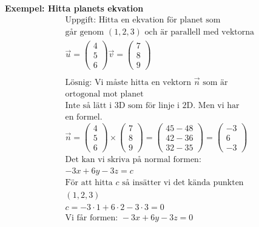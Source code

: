 \begin{multicols}{2}
\textbf{Exempel: Hitta planets ekvation}
\begin{align*}
  &\text{Uppgift: Hitta en ekvation för planet som } \\
  &\text{går genom $(1, 2, 3)$ och är parallell med vektorna } \\
  &\vec{u} = \begin{pmatrix} 4 \\ 5 \\ 6 \end{pmatrix}
  \vec{v} = \begin{pmatrix} 7 \\ 8 \\ 9 \end{pmatrix} \\
  &\\
  &\text{Lösnig: Vi måste hitta en vektorn $\vec{n}$ som är} \\
  &\text{ortogonal mot planet}  \\
  &\text{Inte så lätt i 3D som för linje i 2D. Men vi har} \\
  &\text{en formel.} \\
  &\vec{n} = \begin{pmatrix} 4 \\ 5 \\ 6 \end{pmatrix} \times
  \begin{pmatrix} 7 \\ 8 \\ 9 \end{pmatrix} =
  \begin{pmatrix} 45-48 \\ 42-36 \\ 32-35 \end{pmatrix} =
  \begin{pmatrix} -3 \\ 6 \\ -3 \end{pmatrix} \\
  &\text{Det kan vi skriva på normal formen: } \\
  &-3x+6y-3z=c \\
  &\text{För att hitta $c$ så insätter vi det kända punkten} \\
  &(1,2,3) \\
  &c = -3\cdot{1}+6\cdot{2}-3\cdot{3} = 0 \\
  &\text{Vi får formen: } -3x+6y-3z=0 \\
\end{align*}



\end{multicols}
